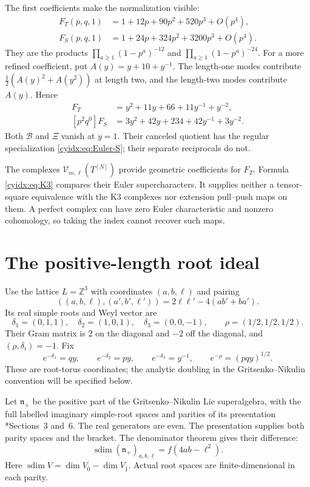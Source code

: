 The first coefficients make the normalization visible:
\begin{align}
 F_T(p,q,1)&=1+12p+90p^2+520p^3+O(p^4),\label{cyidx:eq:Euler-T}\\
 F_S(p,q,1)&=1+24p+324p^2+3200p^3+O(p^4).
 \label{cyidx:eq:Euler-S}
\end{align}
They are the products
\(\prod_{a\geq1}(1-p^a)^{-12}\) and
\(\prod_{a\geq1}(1-p^a)^{-24}\).
For a more refined coefficient, put \(A(y)=y+10+y^{-1}\).
The length-one modes contribute
\(\tfrac12(A(y)^2+A(y^2))\) at length two, and the
length-two modes contribute \(A(y)\). Hence
\begin{align}
 [p^2q^0]F_T&=y^2+11y+66+11y^{-1}+y^{-2},\label{cyidx:eq:two-T}\\
 [p^2q^0]F_S&=3y^2+42y+234+42y^{-1}+3y^{-2}.
 \label{cyidx:eq:two-S}
\end{align}
Both \(\mathcal B\) and \(\Xi\) vanish at \(y=1\).
Their canceled quotient has the regular specialization
\eqref{cyidx:eq:Euler-S}; their separate reciprocals do not.

The complexes \(\mathscr V_{m,\ell}(T^{[N]})\) provide
geometric coefficients for \(F_T\). Formula
\eqref{cyidx:eq:K3} compares their Euler supercharacters.
It supplies neither a tensor-square equivalence with
the K3 complexes nor extension pull--push maps on them.
A perfect complex can have zero Euler characteristic
and nonzero cohomology, so taking the index cannot
recover such maps.

\section{The positive-length root ideal}
\label{cyidx:sec:root-ideal}

Use the lattice \(L=\mathbb Z^3\) with coordinates
\((a,b,\ell)\) and pairing
\[
 ((a,b,\ell),(a',b',\ell'))=
 2\ell\ell'-4(ab'+ba').
\]
Its real simple roots and Weyl vector are
\begin{equation}\label{cyidx:eq:real-roots}
 \delta_1=(0,1,1),\quad
 \delta_2=(1,0,1),\quad
 \delta_3=(0,0,-1),\qquad
 \rho=(1/2,1/2,1/2).
\end{equation}
Their Gram matrix is \(2\) on the diagonal and \(-2\)
off the diagonal, and \((\rho,\delta_i)=-1\).
Fix
\[
 e^{-\delta_1}=qy,\qquad e^{-\delta_2}=py,\qquad
 e^{-\delta_3}=y^{-1},\qquad e^{-\rho}=(pqy)^{1/2}.
\]
These are root-torus coordinates; the analytic doubling
in the Gritsenko--Nikulin convention will be specified below.

Let \(\mathfrak n_+\) be the positive part of the
Gritsenko--Nikulin Lie superalgebra, with the full labelled
imaginary simple-root spaces and parities of its presentation
\cite{GN97}*{Sections~3 and~6}.
The real generators are even. The presentation supplies
both parity spaces and the bracket. The denominator theorem
gives their difference:
\[
 \operatorname{sdim}(\mathfrak n_+)_{a,b,\ell}
       =f(4ab-\ell^2).
\]
Here \(\operatorname{sdim}V=\dim V_{\bar0}-\dim V_{\bar1}\).
Actual root spaces are finite-dimensional in each parity.

